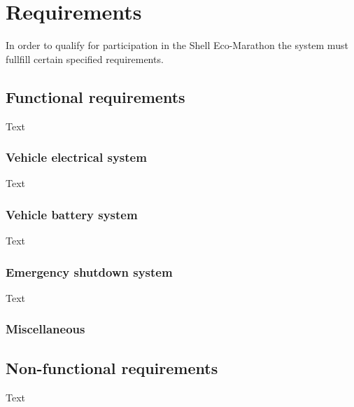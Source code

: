 \chapter{Requirements}
In order to qualify for participation in the Shell Eco-Marathon the system must fullfill certain specified requirements.

\section{Functional requirements}
Text

\subsection{Vehicle electrical system}
Text

\subsection{Vehicle battery system}
Text

\subsection{Emergency shutdown system}
Text

\subsection{Miscellaneous}

\section{Non-functional requirements}
Text